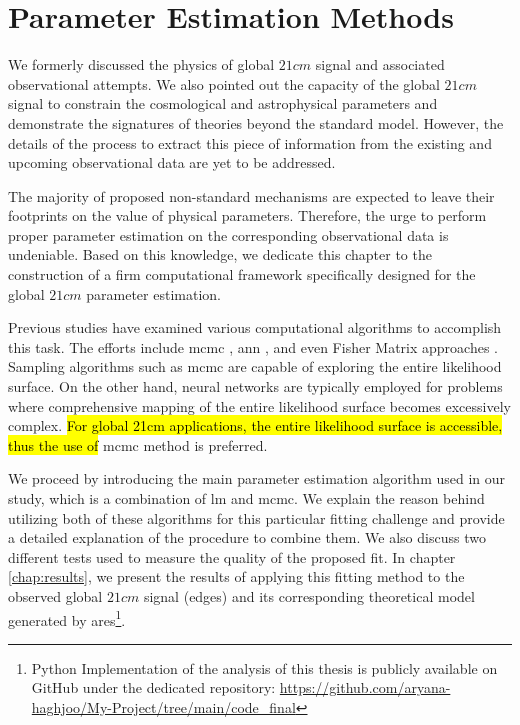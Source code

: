 \documentclass[12pt, TexShade, letterpaper]{report}
\begin{document}
\chapter{Parameter Estimation Methods}
\label{chap:method}
We formerly discussed the physics of global $21cm$ signal and associated observational attempts. We also pointed out the capacity of the global $21cm$ signal to constrain the cosmological and astrophysical parameters and demonstrate the signatures of theories beyond the standard model. However, the details of the process to extract this piece of information from the existing and upcoming observational data are yet to be addressed. \par
The majority of proposed non-standard mechanisms are expected to leave their footprints on the value of physical parameters. Therefore, the urge to perform proper parameter estimation on the corresponding observational data is undeniable. Based on this knowledge, we dedicate this chapter to the construction of a firm computational framework specifically designed for the global $21cm$ parameter estimation. \par
Previous studies have examined various computational algorithms to accomplish this task. The efforts include \gls{mcmc} \cite{pe_mcmc_1, pe_mcmc_2}, \gls{ann} \cite{pe_nn_1}, and even Fisher Matrix approaches \cite{pe_fisher_2}. Sampling algorithms such as \gls{mcmc} are capable of exploring the entire likelihood surface. On the other hand, neural networks are typically employed for problems where comprehensive mapping of the entire likelihood surface becomes excessively complex. \hl{For global 21cm applications, the entire likelihood surface is accessible, thus the use of} \gls{mcmc} method is preferred.\par
We proceed by introducing the main parameter estimation algorithm used in our study, which is a combination of \gls{lm} and \gls{mcmc}. We explain the reason behind utilizing both of these algorithms for this particular fitting challenge and provide a detailed explanation of the procedure to combine them. We also discuss two different tests used to measure the quality of the proposed fit. In chapter \ref{chap:results}, we present the results of applying this fitting method to the observed global $21cm$ signal (\gls{edges}) and its corresponding theoretical model generated by \gls{ares}\footnote{Python Implementation of the analysis of this thesis is publicly available on GitHub under the dedicated repository: 
\href{https://github.com/aryana-haghjoo/My-Project/tree/main/code_final}{https://github.com/aryana-haghjoo/My-Project/tree/main/code\_final}}.\par
\end{document}
